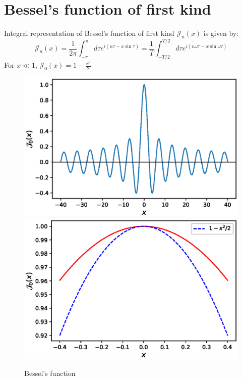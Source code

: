 \documentclass[11pt,a4paper]{article}
\begin{document}
\section{Bessel's function of first kind}
Integral representation of Bessel's function of first kind $\mathcal{J}_n (x)$ is given by:
\begin{equation}
\mathcal{J}_n (x)=  \frac{1}{2 \pi} \int_{-\pi}^\pi d\tau e^{i(n \tau - x \sin \tau)}= \frac{1}{T} \int_{-T/2}^{T/2} d\tau e^{i(n   \omega \tau - x \sin \omega \tau)}
\end{equation}
For $x \ll1$, $\mathcal{J}_0 (x)= 1- \frac{x^2}{2}$

\begin{figure}[!ht]
\begin{center}
\includegraphics[scale=0.5]{pics/bessel_fun.eps} 
\includegraphics[scale=0.5]{pics/bessel_fun_zoom.eps} 
\caption{Bessel's function }
\end{center}
\end{figure}

 


%
\end{document}
